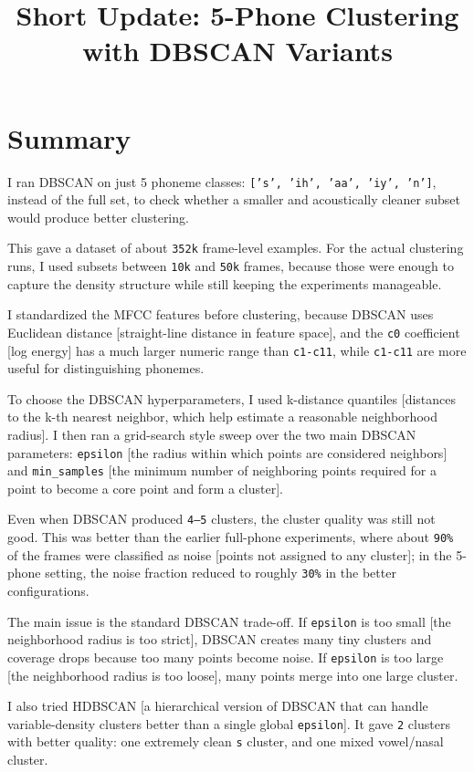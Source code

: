 \documentclass[11pt]{article}
\title{Short Update: 5-Phone Clustering with DBSCAN Variants}
\author{}
\date{}
\begin{document}
\maketitle
\thispagestyle{empty}

\section*{Summary}

I ran DBSCAN on just 5 phoneme classes: \texttt{['s', 'ih', 'aa', 'iy', 'n']}, instead of the full set, to check whether a smaller and acoustically cleaner subset would produce better clustering.

This gave a dataset of about \texttt{352k} frame-level examples. For the actual clustering runs, I used subsets between \texttt{10k} and \texttt{50k} frames, because those were enough to capture the density structure while still keeping the experiments manageable.

I standardized the MFCC features before clustering, because DBSCAN uses Euclidean distance [straight-line distance in feature space], and the \texttt{c0} coefficient [log energy] has a much larger numeric range than \texttt{c1-c11}, while \texttt{c1-c11} are more useful for distinguishing phonemes.

To choose the DBSCAN hyperparameters, I used k-distance quantiles [distances to the k-th nearest neighbor, which help estimate a reasonable neighborhood radius]. I then ran a grid-search style sweep over the two main DBSCAN parameters: \texttt{epsilon} [the radius within which points are considered neighbors] and \texttt{min\_samples} [the minimum number of neighboring points required for a point to become a core point and form a cluster].

Even when DBSCAN produced \texttt{4--5} clusters, the cluster quality was still not good. This was better than the earlier full-phone experiments, where about \texttt{90\%} of the frames were classified as noise [points not assigned to any cluster]; in the 5-phone setting, the noise fraction reduced to roughly \texttt{30\%} in the better configurations.

The main issue is the standard DBSCAN trade-off. If \texttt{epsilon} is too small [the neighborhood radius is too strict], DBSCAN creates many tiny clusters and coverage drops because too many points become noise. If \texttt{epsilon} is too large [the neighborhood radius is too loose], many points merge into one large cluster.

I also tried HDBSCAN [a hierarchical version of DBSCAN that can handle variable-density clusters better than a single global \texttt{epsilon}]. It gave \texttt{2} clusters with better quality: one extremely clean \texttt{s} cluster, and one mixed vowel/nasal cluster.
\end{document}
